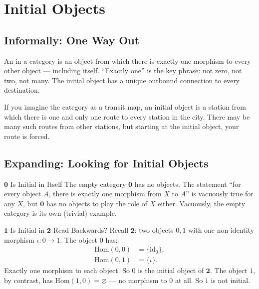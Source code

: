 \section{Initial Objects}
\label{sec:initial}

\subsection{Informally: One Way Out}

An  in a category is an object from which there is
exactly one morphism to every other object --- including itself. ``Exactly
one'' is the key phrase: not zero, not two, not many. The initial object
has a unique outbound connection to every destination.

If you imagine the category as a transit map, an initial object is a station
from which there is one and only one route to every station in the city.
There may be many such routes from other stations, but starting at the
initial object, your route is forced.

\subsection{Expanding: Looking for Initial Objects}

\begin{example}{$\mathbf{0}$ Is Initial in Itself}
The empty category $\mathbf{0}$ has no objects. The statement ``for every
object $A$, there is exactly one morphism from $X$ to $A$'' is vacuously
true for any $X$, but $\mathbf{0}$ has no objects to play the role of $X$
either. Vacuously, the empty category is its own (trivial) example.
\end{example}

\begin{example}{$\mathbf{1}$ Is Initial in $\mathbf{2}$ Read Backwards?}
Recall $\mathbf{2}$: two objects $0, 1$ with one non-identity morphism
$\iota : 0 \to 1$. The object $0$ has:
\begin{align*}
  \mathrm{Hom}(0, 0) &= \{\mathrm{id}_0\}, \\
  \mathrm{Hom}(0, 1) &= \{\iota\}.
\end{align*}
Exactly one morphism to each object. So $0$ is the initial object of
$\mathbf{2}$. The object $1$, by contrast, has $\mathrm{Hom}(1, 0) =
\varnothing$ --- no morphism to $0$ at all. So $1$ is not initial.
\end{example}


